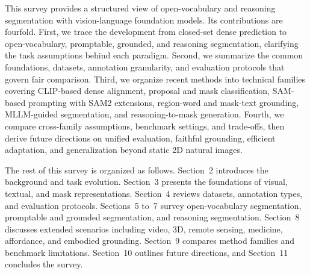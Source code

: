 This survey provides a structured view of open-vocabulary and reasoning segmentation with vision-language foundation models. Its contributions are fourfold. First, we trace the development from closed-set dense prediction to open-vocabulary, promptable, grounded, and reasoning segmentation, clarifying the task assumptions behind each paradigm. Second, we summarize the common foundations, datasets, annotation granularity, and evaluation protocols that govern fair comparison. Third, we organize recent methods into technical families covering CLIP-based dense alignment, proposal and mask classification, SAM-based prompting with SAM2 extensions, region-word and mask-text grounding, MLLM-guided segmentation, and reasoning-to-mask generation. Fourth, we compare cross-family assumptions, benchmark settings, and trade-offs, then derive future directions on unified evaluation, faithful grounding, efficient adaptation, and generalization beyond static 2D natural images.

The rest of this survey is organized as follows. Section~2 introduces the background and task evolution. Section~3 presents the foundations of visual, textual, and mask representations. Section~4 reviews datasets, annotation types, and evaluation protocols. Sections~5 to~7 survey open-vocabulary segmentation, promptable and grounded segmentation, and reasoning segmentation. Section~8 discusses extended scenarios including video, 3D, remote sensing, medicine, affordance, and embodied grounding. Section~9 compares method families and benchmark limitations. Section~10 outlines future directions, and Section~11 concludes the survey.
